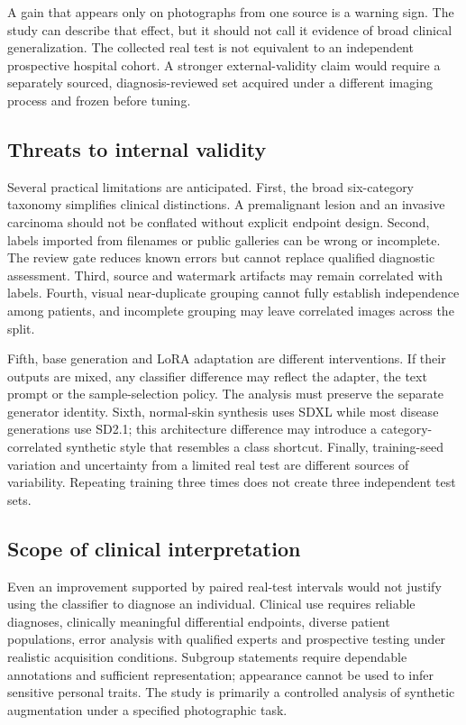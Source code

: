 A gain that appears only on photographs from one source is a warning sign. The study can describe that effect, but it should not call it evidence of broad clinical generalization. The collected real test is not equivalent to an independent prospective hospital cohort. A stronger external-validity claim would require a separately sourced, diagnosis-reviewed set acquired under a different imaging process and frozen before tuning.

\subsection{Threats to internal validity}
Several practical limitations are anticipated. First, the broad six-category taxonomy simplifies clinical distinctions. A premalignant lesion and an invasive carcinoma should not be conflated without explicit endpoint design. Second, labels imported from filenames or public galleries can be wrong or incomplete. The review gate reduces known errors but cannot replace qualified diagnostic assessment. Third, source and watermark artifacts may remain correlated with labels. Fourth, visual near-duplicate grouping cannot fully establish independence among patients, and incomplete grouping may leave correlated images across the split.

Fifth, base generation and LoRA adaptation are different interventions. If their outputs are mixed, any classifier difference may reflect the adapter, the text prompt or the sample-selection policy. The analysis must preserve the separate generator identity. Sixth, normal-skin synthesis uses SDXL while most disease generations use SD2.1; this architecture difference may introduce a category-correlated synthetic style that resembles a class shortcut. Finally, training-seed variation and uncertainty from a limited real test are different sources of variability. Repeating training three times does not create three independent test sets.

\subsection{Scope of clinical interpretation}
Even an improvement supported by paired real-test intervals would not justify using the classifier to diagnose an individual. Clinical use requires reliable diagnoses, clinically meaningful differential endpoints, diverse patient populations, error analysis with qualified experts and prospective testing under realistic acquisition conditions. Subgroup statements require dependable annotations and sufficient representation; appearance cannot be used to infer sensitive personal traits. The study is primarily a controlled analysis of synthetic augmentation under a specified photographic task.

